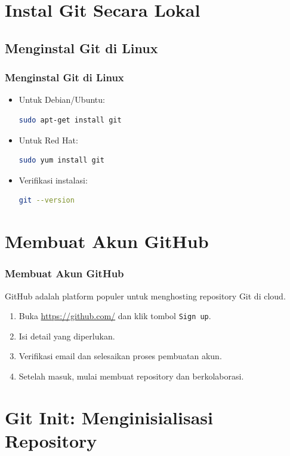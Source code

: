 \documentclass[aspectratio=169, table]{beamer}
\begin{document}
	\section{Instal Git Secara Lokal}
	
	
	\subsection{Menginstal Git di Linux}
	
	\begin{frame}[fragile]
		\frametitle{Menginstal Git di Linux}
		\begin{itemize}
			\item Untuk Debian/Ubuntu:
			\begin{lstlisting}[language=bash]
				sudo apt-get install git
			\end{lstlisting}
			\item Untuk Red Hat:
			\begin{lstlisting}[language=bash]
				sudo yum install git
			\end{lstlisting}
			\item Verifikasi instalasi:
			\begin{lstlisting}[language=bash]
				git --version
			\end{lstlisting}
		\end{itemize}
	\end{frame}
	
	\section{Membuat Akun GitHub}
	
	\begin{frame}[fragile]
		\frametitle{Membuat Akun GitHub}
		GitHub adalah platform populer untuk menghosting repository Git di cloud.
		\begin{enumerate}
			\item Buka \url{https://github.com/} dan klik tombol \texttt{Sign up}.
			\item Isi detail yang diperlukan.
			\item Verifikasi email dan selesaikan proses pembuatan akun.
			\item Setelah masuk, mulai membuat repository dan berkolaborasi.
		\end{enumerate}
	\end{frame}
	
	\section{Git Init: Menginisialisasi Repository}
	
\end{document}
